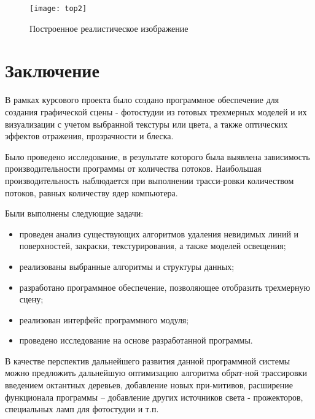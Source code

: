 \documentclass[12pt,a4paper,oneside]{report}
\begin{document}
	\begin{figure}[H]
		\centering
		\texttt{[image: top2]}
		\caption{Построенное реалистическое изображение}
	\end{figure}

	

	\chapter*{Заключение}
	
	 \quad В рамках курсового проекта было создано программное обеспечение для создания графической сцены - фотостудии из готовых трехмерных моделей и их визуализации с учетом выбранной текстуры или цвета, а также оптических эффектов отражения, прозрачности и блеска.
	 
	Было проведено исследование, в результате которого была выявлена зависимость производительности программы от количества потоков. Наибольшая производительность наблюдается при выполнении трасси-ровки количеством потоков, равных количеству ядер компьютера.
	
	 Были выполнены следующие задачи:
	\begin{itemize}
		\item проведен анализ существующих алгоритмов удаления невидимых линий и поверхностей, закраски, текстурирования, а также моделей освещения;
		\item реализованы выбранные алгоритмы и структуры данных;
		\item разработано программное обеспечение, позволяющее отобразить трехмерную сцену;
		\item реализован интерфейс программного модуля;
		\item проведено исследование на основе разработанной программы. 
	\end{itemize}
	
	В качестве перспектив дальнейшего развития данной программной системы можно предложить дальнейшую оптимизацию алгоритма обрат-ной трассировки введением октантных деревьев, добавление новых при-митивов, расширение функционала программы – добавление других источников света - прожекторов, специальных ламп для фотостудии и т.п.
\end{document}
